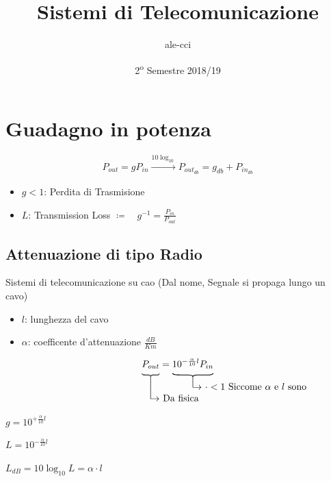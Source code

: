 \documentclass{article}
\date{2\textsuperscript{o} Semestre 2018/19}
\title{Sistemi di Telecomunicazione}
\author{ale-cci }
\def\myupbracefill#1{\rotatebox{90}{\stretchto{\{}{#1}}}
\def\rlwd{.5pt}
\newcommand\notate[4][B]{%
  \if B#1\else\def\myupbracefill##1{}\fi%
  \def\useanchorwidth{T}%
  \setbox0=\hbox{$\displaystyle#2$}%
  \def\stackalignment{c}\stackunder[-6pt]{%
    \def\stackalignment{c}\stackunder[-1.5pt]{%
      \stackunder[2pt]{\strut $\displaystyle#2$}{\myupbracefill{\wd0}}}{%
    \rule{\rlwd}{#3\baselineskip}}}{%
  \strut\kern9pt$\rightarrow$\smash{\rlap{$~\displaystyle#4$}}}%
}
\begin{document}
\begin{titlingpage}
\maketitle
\end{titlingpage}
\newpage

\tableofcontents

\newpage

\section{Guadagno in potenza}

\[
    P_{out} = gP_{in}  \xrightarrow[]{10\log_{10}{}} P_{out_{db}} = g_{db} + P_{in_{db}}
\]

\begin{itemize}
    \item $g < 1$: Perdita di Trasmisione

    \item $L$: Transmission Loss $\coloneqq \quad g^{-1}=\frac{P_{in}}{P_{out}}$

\end{itemize}

\subsection{Attenuazione di tipo Radio}
Sistemi di telecomunicazione su cao (Dal nome, Segnale si propaga lungo un cavo)

\begin{itemize}
    \item $l$: lunghezza del cavo
    \item $\alpha$: coefficente d'attenuazione $\frac{dB}{Km}$
\end{itemize}

\[
    \notate{P_{out}}{2}{\text{Da fisica}} = \notate{10^{-\frac{\alpha}{10}l} P_{in} }{1}{\text{$\cdot < 1 $ Siccome $\alpha$ e $l$ sono positivi}}
\]

$g = 10^{+\frac{\alpha}{10}l}$

$L=10^{-\frac{\alpha}{10} l}$

$L_{dB} = 10\log_{10} L = \alpha \cdot l$
\end{document}
